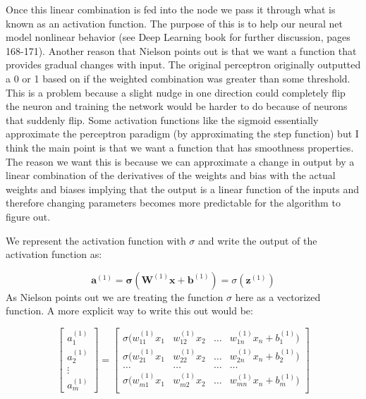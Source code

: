 Once this linear combination is fed into the node we pass it through what is known as an activation function. The purpose of this is to help our neural net model nonlinear behavior (see Deep Learning book for further discussion, pages 168-171). Another reason that Nielson points out is that we want a function that provides gradual changes with input. The original perceptron originally outputted a 0 or 1 based on if the weighted combination was greater than some threshold. This is a problem because a slight nudge in one direction could completely flip the neuron and training the network would be harder to do because of neurons that suddenly flip. Some activation functions like the sigmoid essentially approximate the perceptron paradigm (by approximating the step function) but I think the main point is that we want a function that has smoothness properties. The reason we want this is because we can approximate a change in output by a linear combination of the derivatives of the weights and bias with the actual weights and biases implying that the output is a linear function of the inputs and therefore changing parameters becomes more predictable for the algorithm to figure out.

We represent the activation function with $\sigma$ and write the output of the activation function as:

\begin{equation}
\mathbf{a}^{(1)} = \mathbf{\sigma}(\mathbf{W}^{(1)} \mathbf{x} + \mathbf{b}^{(1)}) = \sigma(\mathbf{z}^{(1)})
\end{equation}
\noindent As Nielson points out we are treating the function $\sigma$ here as a vectorized function. A more explicit way to write this out would be:

\[
\begin{bmatrix}
           a^{(1)}_{1} \\
           a^{(1)}_{2} \\
           \vdots \\
           a^{(1)}_{m}
         \end{bmatrix}
         =
\left[
  \begin{array}{cccc}
    \sigma(w^{(1)}_{11}x_1 & w^{(1)}_{12}x_2 & \hdots & w^{(1)}_{1n}x_n + b_1^{(1)}) \\
    \sigma(w^{(1)}_{21}x_1 & w^{(1)}_{22}x_2 & \hdots & w^{(1)}_{2n}x_n + b_2^{(1)} ) \\
    \hdots &  \hdots  & \hdots &  \hdots \\
    \sigma(w^{(1)}_{m1}x_1 & w^{(1)}_{m2}x_2 & \hdots & w^{(1)}_{mn}x_n + b_m^{(1)} ) \\ 
  \end{array}
\right]
\]

